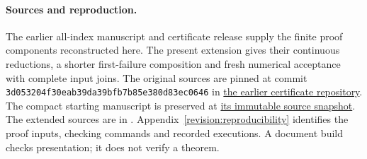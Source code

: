 \paragraph{Sources and reproduction.}
The earlier all-index manuscript and certificate release
\cite{kolodziejekrodziewicz2026exact} supply the finite proof components
reconstructed here. The present extension gives their continuous
reductions, a shorter first-failure composition and fresh numerical
acceptance with complete input joins. The original sources are pinned
at commit \texttt{3d053204f30eab39da39bfb7b85e380d83ec0646} in
\href{https://github.com/rodziewiczk/berry-esseen-certificates/tree/3d053204f30eab39da39bfb7b85e380d83ec0646}{the earlier certificate repository}.
The compact starting manuscript is preserved at
\href{https://github.com/kolodziejek/berry-esseen-certificates/tree/41a6e22d521162d649d09068cb308fd7cc21bddf/manuscript/compact-v16}{its immutable source snapshot}.
The extended sources are in .
Appendix~\ref{revision:reproducibility} identifies the proof inputs,
checking commands and recorded executions. A document build checks
presentation; it does not verify a theorem.
